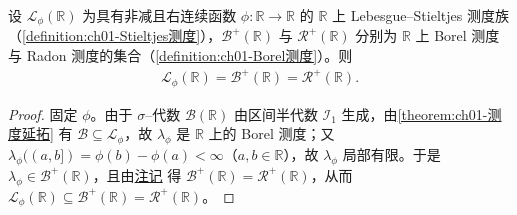 \documentclass[../../main.tex]{subfiles}%
\begin{document}
\begin{proposition}\label{proposition:ch01-Stieltjes等于Radon}
设 $\mathcal{L}_\phi(\mathbb{R})$ 为具有非减且右连续函数 $\phi:\mathbb{R}\to\mathbb{R}$ 的 $\mathbb{R}$ 上 Lebesgue--Stieltjes 测度族（\cref{definition:ch01-Stieltjes测度}），$\mathcal{B}^+(\mathbb{R})$ 与 $\mathcal{R}^+(\mathbb{R})$ 分别为 $\mathbb{R}$ 上 Borel 测度与 Radon 测度的集合（\cref{definition:ch01-Borel测度}）。则
\begin{align*}
\mathcal{L}_\phi(\mathbb{R})=\mathcal{B}^+(\mathbb{R})=\mathcal{R}^+(\mathbb{R}).
\end{align*}
\end{proposition}

\begin{proof}
固定 $\phi$。由于 $\sigma$--代数 $\mathcal{B}(\mathbb{R})$ 由区间半代数 $\mathcal{I}_1$ 生成，由\cref{theorem:ch01-测度延拓} 有 $\mathcal{B}\subseteq\mathcal{L}_\phi$，故 $\lambda_\phi$ 是 $\mathbb{R}$ 上的 Borel 测度；又 $\lambda_\phi((a,b])=\phi(b)-\phi(a)<\infty$（$a,b\in\mathbb{R}$），故 $\lambda_\phi$ 局部有限。于是 $\lambda_\phi\in\mathcal{B}^+(\mathbb{R})$，且由\hyperref[remark:ch01-BorelRadon一致]{注记} 得 $\mathcal{B}^+(\mathbb{R})=\mathcal{R}^+(\mathbb{R})$，从而 $\mathcal{L}_\phi(\mathbb{R})\subseteq\mathcal{B}^+(\mathbb{R})=\mathcal{R}^+(\mathbb{R})$。


\end{proof}
\end{document}
